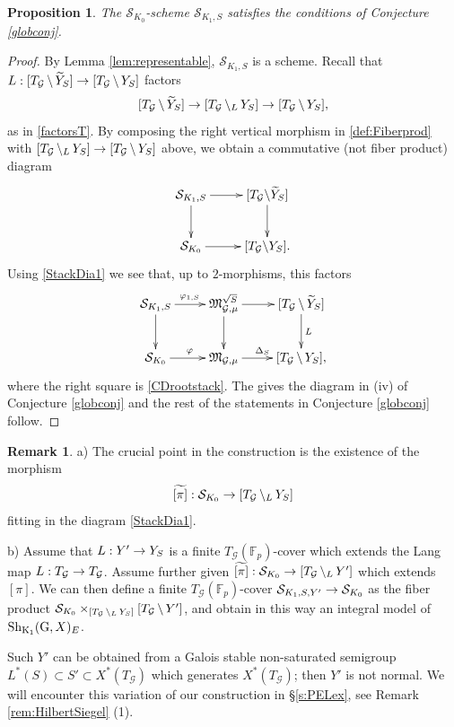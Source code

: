 \documentclass[reqno, 10pt]{amsart}
\makeatletter
\newcommand{\fkM}{\ensuremath{\mathfrak{M}}\xspace}
\newcommand{\BF}{\ensuremath{\mathbb {F}}\xspace}
\newcommand{\CG}{\ensuremath{\mathcal {G}}\xspace}
\newcommand{\CS}{\ensuremath{\mathcal {S}}\xspace}
\newcommand{\RG}{\ensuremath{\mathrm {G}}\xspace}
\newcommand{\RK}{\ensuremath{\mathrm {K}}\xspace}
\newcommand{\wt}{\widetilde}
\newcommand{\bs}{\backslash}
\newtheorem{proposition}[subsubsection]{Proposition}
\theoremstyle{definition}
\newtheorem{remark}[subsubsection]{Remark}
\numberwithin{equation}{subsection}
\numberwithin{subsubsection}{subsection}
\renewcommand{\to}{%
   \ifbool{@display}{\longrightarrow}{\rightarrow}%
   }
\newcommand{\bslash}{\symbol{92}}
\newcommand{\LBS}{\, {\bs}_{\vphantom{A}{L}}\, }
\makeatother
\begin{document}
  
\begin{proposition}\label{prop:Conj}
The  $\CS_{K_0}$-scheme  $\CS_{K_1, S}$  satisfies the conditions of Conjecture \ref{globconj}.
\end{proposition}
\begin{proof}
By Lemma \ref{lem:representable}, $\CS_{K_1, S}$ is a scheme. Recall that $L: [T_\CG\,\bs\, \wt Y_S]\to [T_\CG\,\bs\,  Y_S]$ factors 
 \[
 [T_\CG\,\bs\, \wt Y_S]\to [T_\CG  \LBS Y_S]\to [T_\CG\, \bs\, Y_S] ,
 \]
 as in \eqref{factorsT}. By composing the right vertical morphism in \eqref{def:Fiberprod}
 with $[T_\CG  \LBS Y_S]\to [T_\CG\, \bs\, Y_S]$ above, we obtain a commutative (not fiber product) diagram
 \begin{equation}\label{CDRootStack3}
\begin{aligned}
 \xymatrix{
      \CS_{K_1,S } \ar[r] \ar[d]  &  [T_\CG \bslash \wt Y_S ] \ar[d]  \\
       \CS_{K_0}\ar[r]  & [T_\CG \bslash Y_S ].
        }
        \end{aligned}
\end{equation}
Using \eqref{StackDia1} we see that, up to  $2$-morphisms,  this factors  
\begin{equation}\label{StackDia2}
\begin{aligned}
 \xymatrix{
     \CS_{K_1,S } \ar[r]^{\varphi_{1,S} } \ar[d]_{ }  &     \fkM^{\sqrt{S}}_{\CG,\mu}\ar[r]  \ar[d]  & [T_\CG\, \bs\, \wt Y_S]\ar[d]^{L}\\
     \CS_{K_0 } \ar[r]^{\varphi}  &  \fkM_{\CG,\mu}  \ar[r]^{\Delta_S}  & [T_\CG\, \bs\, Y_S ] ,
        }
        \end{aligned}
\end{equation}
where the right square is \eqref{CDrootstack}. The gives the diagram in (iv) of
Conjecture \ref{globconj} and the rest of the statements in Conjecture \ref{globconj} follow.
\end{proof}

 \begin{remark}\label{rem:NonNormalvariant}
 a)  The crucial point in the construction is the existence of the morphism 
  \[
  \wt{[\pi]}: \CS_{K_0}\to [T_\CG\LBS Y_S]
  \]
  fitting in the diagram \eqref{StackDia1}. 
  
 b)  Assume that   $L: Y'\to Y_S$ is a finite $T_\CG(\BF_p)$-cover which extends the Lang map $L: T_\CG\to T_\CG$. Assume further given $ \wt{[\pi]}: \CS_{K_0}\to [T_\CG\LBS Y']$ which extends $[\pi]$. 
   We can then define a finite $T_\CG(\BF_p)$-cover $\CS_{K_1, S, Y'}\to \CS_{K_0}$ as the fiber product $\CS_{K_0}\times_{[T_\CG\LBS Y_S]}[T_\CG\,\bs\, Y']$, and obtain in this way an integral model of ${\rm Sh}_{\RK_1}(\RG, X)_E$.

  
  Such  $Y'$ can be obtained from  a Galois stable non-saturated semigroup $L^*(S)\subset S'\subset X^*(T_\CG)$ which   generates $X^*(T_\CG)$; then $Y'$ is not normal.  
  We will encounter this variation of our construction in \S \ref{s:PELex}, see Remark \ref{rem:HilbertSiegel} (1).
 \end{remark}
 
\end{document}
